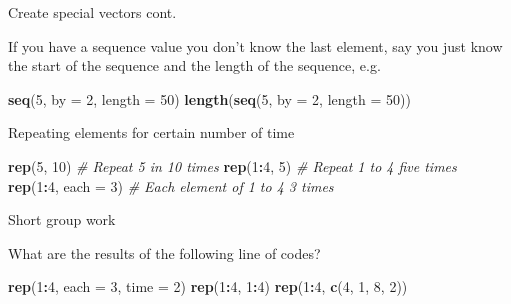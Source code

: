 \documentclass[
  ignorenonframetext,
]{beamer}
\newenvironment{Shaded}{\begin{snugshade}}{\end{snugshade}}
\newcommand{\CommentTok}[1]{\textcolor[rgb]{0.56,0.35,0.01}{\textit{#1}}}
\newcommand{\DataTypeTok}[1]{\textcolor[rgb]{0.13,0.29,0.53}{#1}}
\newcommand{\DecValTok}[1]{\textcolor[rgb]{0.00,0.00,0.81}{#1}}
\newcommand{\KeywordTok}[1]{\textcolor[rgb]{0.13,0.29,0.53}{\textbf{#1}}}
\newcommand{\NormalTok}[1]{#1}
\newcommand{\OperatorTok}[1]{\textcolor[rgb]{0.81,0.36,0.00}{\textbf{#1}}}
\begin{document}
\begin{frame}[fragile]{Create special vectors cont.}
\protect\hypertarget{create-special-vectors-cont.}{}

If you have a sequence value you don't know the last element, say you
just know the start of the sequence and the length of the sequence, e.g.

\begin{Shaded}
\begin{Highlighting}[]
\KeywordTok{seq}\NormalTok{(}\DecValTok{5}\NormalTok{, }\DataTypeTok{by =} \DecValTok{2}\NormalTok{, }\DataTypeTok{length =} \DecValTok{50}\NormalTok{)}
\KeywordTok{length}\NormalTok{(}\KeywordTok{seq}\NormalTok{(}\DecValTok{5}\NormalTok{, }\DataTypeTok{by =} \DecValTok{2}\NormalTok{, }\DataTypeTok{length =} \DecValTok{50}\NormalTok{))}
\end{Highlighting}
\end{Shaded}

Repeating elements for certain number of time

\begin{Shaded}
\begin{Highlighting}[]
\KeywordTok{rep}\NormalTok{(}\DecValTok{5}\NormalTok{, }\DecValTok{10}\NormalTok{) }\CommentTok{# Repeat 5 in 10 times}
\KeywordTok{rep}\NormalTok{(}\DecValTok{1}\OperatorTok{:}\DecValTok{4}\NormalTok{, }\DecValTok{5}\NormalTok{) }\CommentTok{# Repeat 1 to 4 five times}
\KeywordTok{rep}\NormalTok{(}\DecValTok{1}\OperatorTok{:}\DecValTok{4}\NormalTok{, }\DataTypeTok{each =} \DecValTok{3}\NormalTok{) }\CommentTok{# Each element of 1 to 4 3 times}
\end{Highlighting}
\end{Shaded}

\end{frame}

\begin{frame}[fragile]{Short group work}
\protect\hypertarget{short-group-work-1}{}

\begin{block}{What are the results of the following line of codes?}

\begin{Shaded}
\begin{Highlighting}[]
\KeywordTok{rep}\NormalTok{(}\DecValTok{1}\OperatorTok{:}\DecValTok{4}\NormalTok{, }\DataTypeTok{each =} \DecValTok{3}\NormalTok{, }\DataTypeTok{time =} \DecValTok{2}\NormalTok{)}
\KeywordTok{rep}\NormalTok{(}\DecValTok{1}\OperatorTok{:}\DecValTok{4}\NormalTok{, }\DecValTok{1}\OperatorTok{:}\DecValTok{4}\NormalTok{)}
\KeywordTok{rep}\NormalTok{(}\DecValTok{1}\OperatorTok{:}\DecValTok{4}\NormalTok{, }\KeywordTok{c}\NormalTok{(}\DecValTok{4}\NormalTok{, }\DecValTok{1}\NormalTok{, }\DecValTok{8}\NormalTok{, }\DecValTok{2}\NormalTok{))}
\end{Highlighting}
\end{Shaded}

\end{block}

\end{frame}
\end{document}
